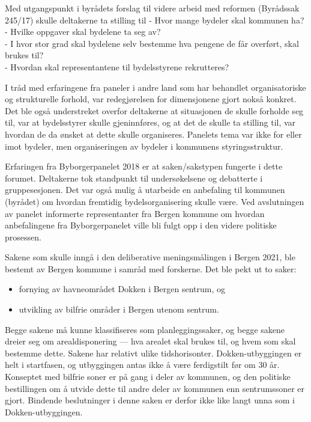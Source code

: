 \documentclass[
  12pt,
  a4paper, 12pt]{article}
\providecommand{\tightlist}{%
  \setlength{\itemsep}{0pt}\setlength{\parskip}{0pt}}
\begin{document}
Med utgangspunkt i byrådets forslag til videre arbeid med reformen (Byrådssak 245/17) skulle deltakerne ta stilling til
- Hvor mange bydeler skal kommunen ha?\\
- Hvilke oppgaver skal bydelene ta seg av?\\
- I hvor stor grad skal bydelene selv bestemme hva pengene de får overført, skal brukes til?\\
- Hvordan skal representantene til bydelsstyrene rekrutteres?

I tråd med erfaringene fra paneler i andre land som har behandlet organisatoriske og strukturelle forhold, var redegjørelsen for dimensjonene gjort nokså konkret. Det ble også understreket overfor deltakerne at situasjonen de skulle forholde seg til, var at bydelsstyrer skulle gjeninnføres, og at det de skulle ta stilling til, var hvordan de da ønsket at dette skulle organiseres. Panelets tema var ikke for eller imot bydeler, men organiseringen av bydeler i kommunens styringsstruktur.

Erfaringen fra Byborgerpanelet 2018 er at saken/sakstypen fungerte i dette forumet. Deltakerne tok standpunkt til undersøkelsene og debatterte i gruppesesjonen. Det var også mulig å utarbeide en anbefaling til kommunen (byrådet) om hvordan fremtidig bydelsorganisering skulle være. Ved avslutningen av panelet informerte representanter fra Bergen kommune om hvordan anbefalingene fra Byborgerpanelet ville bli fulgt opp i den videre politiske prosessen.

Sakene som skulle inngå i den deliberative meningsmålingen i Bergen 2021, ble bestemt av Bergen kommune i samråd med forskerne. Det ble pekt ut to saker:

\begin{itemize}
\tightlist
\item
  fornying av havneområdet Dokken i Bergen sentrum, og\\
\item
  utvikling av bilfrie områder i Bergen utenom sentrum.
\end{itemize}

Begge sakene må kunne klassifiseres som planleggingssaker, og begge sakene dreier seg om arealdisponering --- hva arealet skal brukes til, og hvem som skal bestemme dette. Sakene har relativt ulike tidshorisonter. Dokken-utbyggingen er helt i startfasen, og utbyggingen antas ikke å være ferdigstilt før om 30 år. Konseptet med bilfrie soner er på gang i deler av kommunen, og den politiske bestillingen om å utvide dette til andre deler av kommunen enn sentrumssoner er gjort. Bindende beslutninger i denne saken er derfor ikke like langt unna som i Dokken-utbyggingen.
\end{document}
